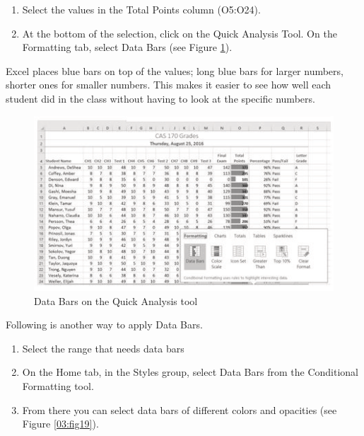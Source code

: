 \begin{enumerate}
	\item Select the values in the Total Points column (\textsf{O5:O24}).
	\item At the bottom of the selection, click on the Quick Analysis Tool. On the Formatting tab, select Data Bars (see Figure \ref{03:fig18}).
\end{enumerate}

Excel places blue bars on top of the values; long blue bars for larger numbers, shorter ones for smaller numbers. This makes it easier to see how well each student did in the class without having to look at the specific numbers.

\begin{figure}[H]
	\centering
	\includegraphics[width=\maxwidth{.95\linewidth}]{gfx/ch03_fig18}
	\caption{Data Bars on the Quick Analysis tool}
	\label{03:fig18}
\end{figure}


Following is another way to apply Data Bars.

\begin{enumerate}
	\item Select the range that needs data bars
	\item On the Home tab, in the Styles group, select Data Bars from the Conditional Formatting tool.
	\item From there you can select data bars of different colors and opacities (see Figure \ref{03:fig19}).
\end{enumerate}

